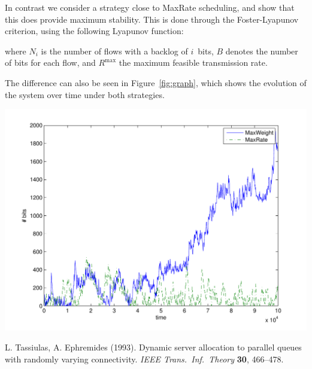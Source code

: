 \documentclass[a4paper,11pt]{article}
\begin{document}
\begin{slidetop}
\begin{multicols}{2}
In contrast we consider a strategy close to MaxRate scheduling, and show that this does provide maximum stability. This is done through the Foster-Lyapunov criterion, using the following Lyapunov function:

\bigskip 

where $N_i$ is the number of flows with a backlog of $i$~bits, $B$ denotes the number of bits for each flow, and $R^{\max}$ the maximum feasible transmission rate.

The difference can also be seen in Figure~\ref{fig:graph}, which shows the evolution of the system over time under both strategies.

\begin{center}
\includegraphics[width=\linewidth]{graph_unstable2}
\end{center}

\begin{thebibliography}{99}
L. Tassiulas, A. Ephremides (1993).
Dynamic server allocation to parallel queues with randomly varying
connectivity.
{\it IEEE Trans.\ Inf.\ Theory} {\bf 30},
466--478.
\end{thebibliography}
\end{multicols}
\end{slidetop}
\end{document}
